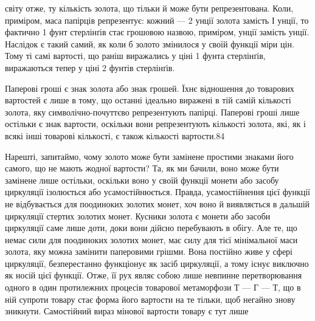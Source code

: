 світу отже, ту кількість золота, що тільки й може бути репрезентована.
Коли, приміром, маса папірців репрезентує: кожний —
2 унції золота замість І унції, то фактично 1 фунт стерлінґів
стає грошовою назвою, приміром,  унції замість  унції.
Наслідок є такий самий, як коли б золото змінилося у своїй
функції міри цін. Тому ті самі вартості, що раніш виражались
у ціні 1 фунта стерлінґів, виражаються тепер у ціні 2 фунтів
стерлінґів.

Паперові гроші є знак золота або знак грошей. Їхнє відношення
до товарових вартостей є лише в тому, що останні ідеально виражені
в тій самій кількості золота, яку символічно-почуттєво
репрезентують папірці. Паперові гроші лише остільки є знак
вартости, оскільки вони репрезентують кількості золота, які,
як і всякі інші товарові кількості, є також кількості вартости.84

Нарешті, запитаймо, чому золото може бути замінене простими
знаками його самого, що не мають жодної вартости? Та, як ми
бачили, воно може бути замінене лише остільки, оскільки воно
у своїй функції монети або засобу циркуляції ізолюється або
усамостійнюється. Правда, усамостійнення цієї функції не відбувається
для поодиноких золотих монет, хоч воно й виявляється
в дальшій циркуляції стертих золотих монет. Кусники золота
є монети або засоби циркуляції саме лише доти, доки вони дійсно
перебувають в обігу. Але те, що немає сили для поодиноких золотих
монет, має силу для тієї мінімальної маси золота, яку можна
замінити паперовими грішми. Вона постійно живе у сфері циркуляції,
безперестанно функціонує як засіб циркуляції, а тому
існує виключно як носій цієї функції. Отже, її рух являє собою
лише невпинне перетворювання одного в один протилежних процесів
товарової метаморфози Т — Г — Т, що в ній супроти товару
стає форма його вартости на те тільки, щоб негайно знову зникнути.
Самостійний вираз мінової вартости товару є тут лише

